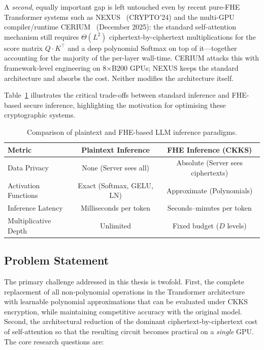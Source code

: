 A \emph{second}, equally important gap is left untouched even by recent pure-FHE Transformer systems such as NEXUS~\cite{zhang2024nexus} (CRYPTO'24) and the multi-GPU compiler/runtime CERIUM~\cite{cerium2025} (December 2025): the standard self-attention mechanism still requires $\Theta(L^2)$ ciphertext-by-ciphertext multiplications for the score matrix $Q\!\cdot\!K^\top$ and a deep polynomial Softmax on top of it---together accounting for the majority of the per-layer wall-time. CERIUM attacks this with framework-level engineering on 8$\times$B200 GPUs; NEXUS keeps the standard architecture and absorbs the cost. Neither modifies the architecture itself.

Table~\ref{tab:plaintext_vs_fhe} illustrates the critical trade-offs between standard inference and FHE-based secure inference, highlighting the motivation for optimising these cryptographic systems.

\begin{table}[h]
\centering
\caption{Comparison of plaintext and FHE-based LLM inference paradigms.}
\label{tab:plaintext_vs_fhe}
\begin{tabular}{|l|c|c|}
\hline
\textbf{Metric} & \textbf{Plaintext Inference} & \textbf{FHE Inference (CKKS)} \\ \hline
Data Privacy & None (Server sees all) & Absolute (Server sees ciphertexts) \\ \hline
Activation Functions & Exact (Softmax, GELU, LN) & Approximate (Polynomials) \\ \hline
Inference Latency & Milliseconds per token & Seconds--minutes per token \\ \hline
Multiplicative Depth & Unlimited & Fixed budget ($D$ levels) \\ \hline
\end{tabular}
\end{table}

\subsection{Problem Statement}
The primary challenge addressed in this thesis is twofold. First, the complete replacement of all non-polynomial operations in the Transformer architecture with learnable polynomial approximations that can be evaluated under CKKS encryption, while maintaining competitive accuracy with the original model. Second, the architectural reduction of the dominant ciphertext-by-ciphertext cost of self-attention so that the resulting circuit becomes practical on a \emph{single} GPU. The core research questions are:

